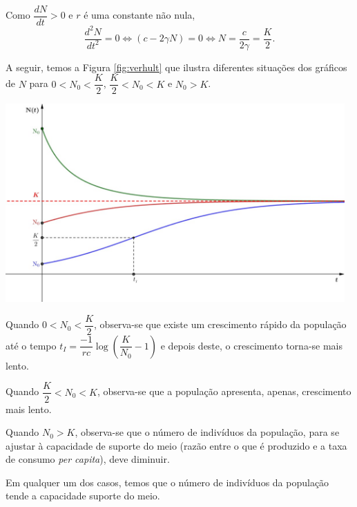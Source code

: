 Como \(\dfrac{dN}{dt} > 0\) e \(r\) é uma constante não nula,
\[
\dfrac{d^2N}{dt^2} = 0
\Leftrightarrow (c-2\gamma N) = 0
\Leftrightarrow N = \dfrac{c}{2\gamma} = \dfrac{K}{2}.
\]


A seguir, temos a Figura \ref{fig:verhult} que ilustra diferentes situações dos gráficos de \(N\) para \(0 < N_0 < \dfrac{K}{2}\), \(\dfrac{K}{2} < N_0 < K\) e \(N_0 > K\).

\begin{center}
\label{fig:verhult}
\includegraphics[height=8.cm,width=13.0cm]{figs/verhulst.jpeg}
\end{center}



Quando \(0 < N_0 < \dfrac{K}{2}\), observa-se que existe um crescimento rápido da população até o tempo \(t_I = \dfrac{-1}{rc} \log\left(\dfrac{K}{N_0}-1\right)\) e depois deste, o crescimento torna-se mais lento.

Quando \(\dfrac{K}{2} < N_0 < K\), observa-se que a população apresenta, apenas, crescimento mais lento.

Quando \(N_0 > K\), observa-se que o número de indivíduos da população, para se ajustar à capacidade de suporte do meio (razão entre o que é produzido e a taxa de consumo \textit{per capita}), deve diminuir.

Em qualquer um dos casos, temos que o número de indivíduos da população tende a capacidade suporte do meio.